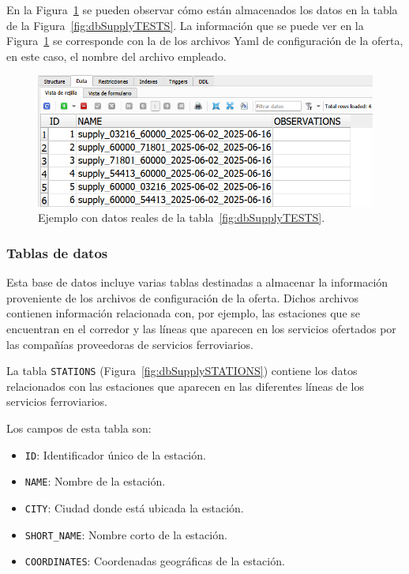 En la Figura~\ref{fig:dbSupplyTESTSWithData} se pueden observar cómo están almacenados los datos en la tabla de la Figura~\ref{fig:dbSupplyTESTS}. La información que se puede ver en la Figura~\ref{fig:dbSupplyTESTSWithData} se corresponde con la de los archivos \acrshort{Yaml} de configuración de la oferta, en este caso, el nombre del archivo empleado. 

\begin{figure}[H]
\centering
\includegraphics[width=.9\textwidth]{fig/Datos reales de las tablas/TESTS_DATA.png}
\caption{Ejemplo con datos reales de la tabla~\ref{fig:dbSupplyTESTS}.}
\label{fig:dbSupplyTESTSWithData}
\end{figure}

\subsubsection{Tablas de datos}

Esta base de datos incluye varias tablas destinadas a almacenar la información proveniente de los archivos de configuración de la oferta. Dichos archivos contienen información relacionada con, por ejemplo, las estaciones que se encuentran en el corredor y las líneas que aparecen en los servicios ofertados por las compañías proveedoras de servicios ferroviarios.

La tabla \texttt{STATIONS} (Figura~\ref{fig:dbSupplySTATIONS}) contiene los datos relacionados con las estaciones que aparecen en las diferentes líneas de los servicios ferroviarios. 

Los campos de esta tabla son: 
\begin{itemize}
    \item \texttt{ID}: Identificador único de la estación.
    \item \texttt{NAME}: Nombre de la estación.
    \item \texttt{CITY}: Ciudad donde está ubicada la estación.
    \item \texttt{SHORT\_NAME}: Nombre corto de la estación.
    \item \texttt{COORDINATES}: Coordenadas geográficas de la estación.
\end{itemize}

